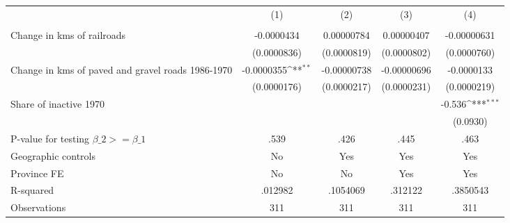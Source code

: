 {
\def\sym#1{\ifmmode^{#1}\else\(^{#1}\)\fi}
\begin{tabular}{l*{4}{c}}
\hline\hline
                &\multicolumn{1}{c}{(1)}&\multicolumn{1}{c}{(2)}&\multicolumn{1}{c}{(3)}&\multicolumn{1}{c}{(4)}\\
                &\multicolumn{1}{c}{}&\multicolumn{1}{c}{}&\multicolumn{1}{c}{}&\multicolumn{1}{c}{}\\
\hline
Change in kms of railroads&-0.0000434         &0.00000784         &0.00000407         &-0.00000631         \\
                &(0.0000836)         &(0.0000819)         &(0.0000802)         &(0.0000760)         \\
[1em]
Change in kms of paved and gravel roads 1986-1970&-0.0000355\sym{**} &-0.00000738         &-0.00000696         &-0.0000133         \\
                &(0.0000176)         &(0.0000217)         &(0.0000231)         &(0.0000219)         \\
[1em]
Share of inactive 1970&                  &                  &                  &   -0.536\sym{***}\\
                &                  &                  &                  & (0.0930)         \\
\hline
P-value for testing $\beta\_{2} >= \beta\_{1}$&     .539         &     .426         &     .445         &     .463         \\
Geographic controls&       No         &      Yes         &      Yes         &      Yes         \\
Province FE     &       No         &       No         &      Yes         &      Yes         \\
R-squared       &  .012982         & .1054069         &  .312122         & .3850543         \\
Observations    &      311         &      311         &      311         &      311         \\
\hline\hline
\end{tabular}
}
